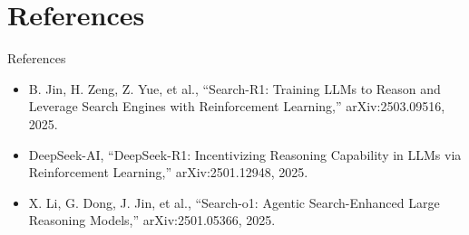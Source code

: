 \documentclass{beamer}
\begin{document}
\section{References}
\begin{frame}{References}
\footnotesize
\begin{itemize}
\item B. Jin, H. Zeng, Z. Yue, et al., ``Search-R1: Training LLMs to Reason and Leverage Search Engines with Reinforcement Learning,'' arXiv:2503.09516, 2025.
\item DeepSeek-AI, ``DeepSeek-R1: Incentivizing Reasoning Capability in LLMs via Reinforcement Learning,'' arXiv:2501.12948, 2025.
\item X. Li, G. Dong, J. Jin, et al., ``Search-o1: Agentic Search-Enhanced Large Reasoning Models,'' arXiv:2501.05366, 2025.
\end{itemize}
\end{frame}
\begin{frame}\vfill{}\vfill\end{frame}
\end{document}

